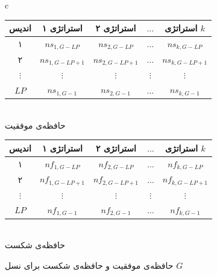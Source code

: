 \documentclass[12pt,a4paper]{article}
\theoremstyle{definition}
\theoremstyle{theorem}
\theoremstyle{definition}
\begin{document}
\begin{figure}[h]   
\caption{حافظه‌ی موفقیت و حافظه‌ی شکست برای نسل $\mathit{G}$}
\renewcommand{\arraystretch}{1.2}
\begin{adjustbox}{center}
\begin{tabular}{c}

\begin{tabular}{ | >{\hspace{0.5cm}}c<{\hspace{0.5cm}} | >{\hspace{0.5cm}}c<{\hspace{0.5cm}} | >{\hspace{0.5cm}}c<{\hspace{0.5cm}} | >{\hspace{0.5cm}}c<{\hspace{0.5cm}} | >{\hspace{0.5cm}}c<{\hspace{0.5cm}} | }
\hline
اندیس
&
استراتژی ۱
&
استراتژی ۲
&
$\dots$
&
استراتژی $k$
\\ \hline
۱ & $ns_{1,G-LP}$ & $ns_{2,G-LP}$ & $\dots$ & $ns_{k,G-LP}$ \\ \hline
۲ & $ns_{1,G-LP+1}$ & $ns_{2,G-LP+1}$ & $\dots$ & $ns_{k,G-LP+1}$ \\ \hline
$\vdots$ & $\vdots$ & $\vdots$ & $\vdots$ & $\vdots$ \\ \hline
$\mathit{LP}$ & $ns_{1,G-1}$ & $ns_{2,G-1}$ & $\dots$ & $ns_{k,G-1}$ \\ \hline
\end{tabular}
\\
حافظه‌ی موفقیت
\\[4ex]
\begin{tabular}{ | >{\hspace{0.5cm}}c<{\hspace{0.5cm}} | >{\hspace{0.5cm}}c<{\hspace{0.5cm}} | >{\hspace{0.5cm}}c<{\hspace{0.5cm}} | >{\hspace{0.5cm}}c<{\hspace{0.5cm}} | >{\hspace{0.5cm}}c<{\hspace{0.5cm}} | }
\hline
اندیس
&
استراتژی ۱
&
استراتژی ۲
&
$\dots$
&
استراتژی $k$
\\ \hline
۱ & $nf_{1,G-LP}$ & $nf_{2,G-LP}$ & $\dots$ & $nf_{k,G-LP}$ \\ \hline
۲ & $nf_{1,G-LP+1}$ & $nf_{2,G-LP+1}$ & $\dots$ & $nf_{k,G-LP+1}$ \\ \hline
$\vdots$ & $\vdots$ & $\vdots$ & $\vdots$ & $\vdots$ \\ \hline
$\mathit{LP}$ & $nf_{1,G-1}$ & $nf_{2,G-1}$ & $\dots$ & $nf_{k,G-1}$ \\ \hline
\end{tabular}
\\
حافظه‌ی شکست
\end{tabular}
\end{adjustbox}
\label{fig:memories}
\end{figure}   
‌
\end{document}

